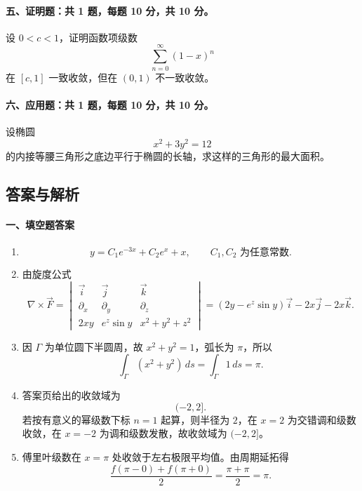 \paragraph*{五、证明题：共 1 题，每题 10 分，共 10 分。}
设 $0<c<1$，证明函数项级数
\[
  \sum_{n=0}^{\infty}(1-x)^n
\]
在 $[c,1]$ 一致收敛，但在 $(0,1)$ 不一致收敛。

\paragraph*{六、应用题：共 1 题，每题 10 分，共 10 分。}
设椭圆
\[
  x^2+3y^2=12
\]
的内接等腰三角形之底边平行于椭圆的长轴，求这样的三角形的最大面积。

\subsection{答案与解析}

\paragraph*{一、填空题答案}
\begin{enumerate}
  \item
  \[
    y=C_1e^{-3x}+C_2e^x+x,\qquad C_1,C_2\text{ 为任意常数}.
  \]

  \item 由旋度公式
  \[
    \nabla\times\vec{F}
    =
    \begin{vmatrix}
      \vec{i} & \vec{j} & \vec{k}\\
      \partial_x & \partial_y & \partial_z\\
      2xy & e^z\sin y & x^2+y^2+z^2
    \end{vmatrix}
    =(2y-e^z\sin y)\vec{i}-2x\vec{j}-2x\vec{k}.
  \]

  \item 因 $\Gamma$ 为单位圆下半圆周，故 $x^2+y^2=1$，弧长为 $\pi$，所以
  \[
    \int_\Gamma (x^2+y^2)\,ds=\int_\Gamma 1\,ds=\pi.
  \]

  \item 答案页给出的收敛域为
  \[
    (-2,2].
  \]
  若按有意义的幂级数下标 $n=1$ 起算，则半径为 $2$，在 $x=2$ 为交错调和级数收敛，在 $x=-2$ 为调和级数发散，故收敛域为 $(-2,2]$。


  \item 傅里叶级数在 $x=\pi$ 处收敛于左右极限平均值。由周期延拓得
  \[
    \frac{f(\pi-0)+f(\pi+0)}{2}=\frac{\pi+\pi}{2}=\pi.
  \]
\end{enumerate}

